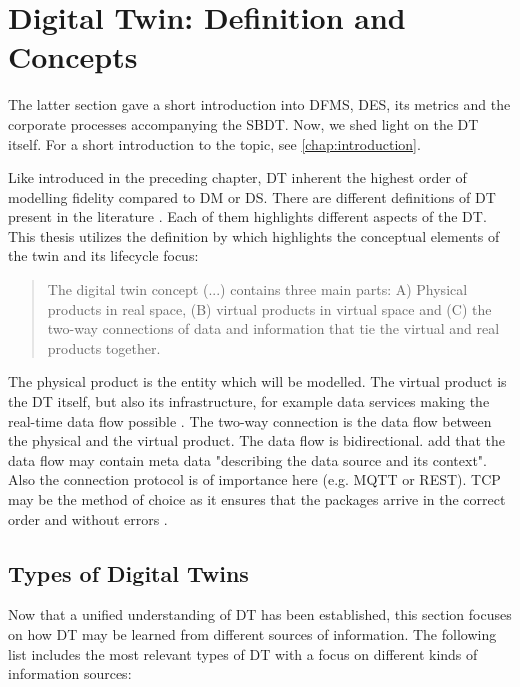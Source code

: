 \section{Digital Twin: Definition and Concepts}
\label{sec:digital-twin}
The latter section gave a short introduction into DFMS, DES, its metrics and the corporate processes accompanying the SBDT. Now, we shed light on the DT itself. For a short introduction to the topic, see \autoref{chap:introduction}.

Like introduced in the preceding chapter, DT inherent the highest order of modelling fidelity compared to DM or DS. There are different definitions of DT present in the literature \autocite{Negri2017promfg,zheng2019application,glaessgen2012digital,Demkovich2018def,boschert2016digital,grieves2014digital,kritzinger2018digital,Tao2018ijamt,zehnder2018representing}. Each of them highlights different aspects of the DT. This thesis utilizes the definition by \autocite{grieves2014digital} which highlights the conceptual elements of the twin and its lifecycle focus:

\begin{quote}
  The digital twin concept (...) contains three main parts: A) Physical products in real space, (B) virtual products in virtual space and (C) the two-way connections of data and information that tie the virtual and real products together. \autocite{grieves2014digital}
\end{quote}

The physical product is the entity which will be modelled. The virtual product is the DT itself, but also its infrastructure, for example data services making the real-time data flow possible \autocite{Tao2018ijamt}. The two-way connection is the data flow between the physical and the virtual product. The data flow is bidirectional. \citeauthor{zehnder2018representing} add that the data flow may contain meta data "describing the data source and its context". Also the connection protocol is of importance here (e.g. MQTT or REST). TCP may be the method of choice as it ensures that the packages arrive in the correct order and without errors \autocite{li2018learning}.

\subsection*{Types of Digital Twins}
\label{sec:types-digital-twins}
Now that a unified understanding of DT has been established, this section focuses on how DT may be learned from different sources of information. The following list includes the most relevant types of DT with a focus on different kinds of information sources:

